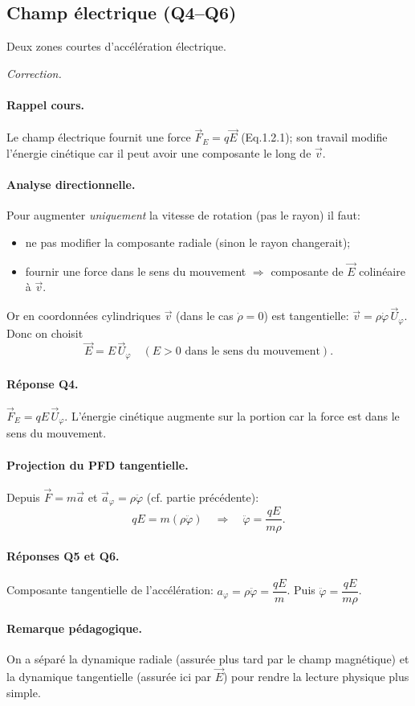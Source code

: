 \documentclass[11pt,a4paper]{article}
\newenvironment{correction}{
    \par\begingroup
    \color{blue!60!black}
    \smallskip\noindent\textit{Correction.}\quad
}{\par\medskip\endgroup}
\begin{document}
\subsection*{Champ électrique (Q4--Q6)}
Deux zones courtes d'accélération électrique.
\begin{correction}
\paragraph{Rappel cours.} Le champ électrique fournit une force $\vec F_E = q\vec E$ (Eq.1.2.1); son travail modifie l'énergie cinétique car il peut avoir une composante le long de $\vec v$.

\paragraph{Analyse directionnelle.} Pour augmenter \emph{uniquement} la vitesse de rotation (pas le rayon) il faut:
\begin{itemize}
  \item ne pas modifier la composante radiale (sinon le rayon changerait);
  \item fournir une force dans le sens du mouvement $\Rightarrow$ composante de $\vec E$ colinéaire à $\vec v$.
\end{itemize}
Or en coordonnées cylindriques $\vec v$ (dans le cas $\dot\rho=0$) est tangentielle: $\vec v = \rho\dot\varphi\,\vec U_{\varphi}$. Donc on choisit
\[
\boxed{\vec E = E\,\vec U_{\varphi}}\quad (E>0 \text{ dans le sens du mouvement}).
\]
\paragraph{Réponse Q4.} $\vec F_E = qE\,\vec U_{\varphi}$. L'énergie cinétique augmente sur la portion car la force est dans le sens du mouvement.

\paragraph{Projection du PFD tangentielle.} Depuis $\vec F = m\vec a$ et $\vec a_{\varphi}= \rho\ddot\varphi$ (cf. partie précédente):
\[
qE = m(\rho\ddot\varphi) \quad \Rightarrow \quad \boxed{\ddot\varphi = \frac{qE}{m\rho}}.
\]
\paragraph{Réponses Q5 et Q6.} Composante tangentielle de l'accélération: $a_{\varphi}= \rho\ddot\varphi = \dfrac{qE}{m}$. Puis $\ddot\varphi = \dfrac{qE}{m\rho}$.

\paragraph{Remarque pédagogique.} On a séparé la dynamique radiale (assurée plus tard par le champ magnétique) et la dynamique tangentielle (assurée ici par $\vec E$) pour rendre la lecture physique plus simple.
\end{correction}
\end{document}
